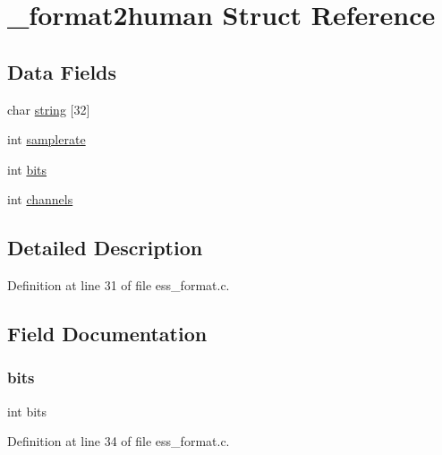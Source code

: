 \hypertarget{struct__format2human}{}\section{\+\_\+format2human Struct Reference}
\label{struct__format2human}
\subsection*{Data Fields}
\begin{DoxyCompactItemize}
\item 
char \hyperlink{struct__format2human_a14f2551e7b5032527b89aa2d4025523a}{string} \mbox{[}32\mbox{]}
\item 
int \hyperlink{struct__format2human_ac38751c7169cfeb9325a947cc0484286}{samplerate}
\item 
int \hyperlink{struct__format2human_ad1e28a1a66a25529b0b61b9ca4e66d44}{bits}
\item 
int \hyperlink{struct__format2human_a178795099d0608972755dfef8d8367e3}{channels}
\end{DoxyCompactItemize}


\subsection{Detailed Description}


Definition at line 31 of file ess\+\_\+format.\+c.



\subsection{Field Documentation}
\mbox{\label{struct__format2human_ad1e28a1a66a25529b0b61b9ca4e66d44}} 
\subsubsection{\texorpdfstring{bits}{bits}}
{\footnotesize\ttfamily int bits}



Definition at line 34 of file ess\+\_\+format.\+c.

\mbox{\label{struct__format2human_a178795099d0608972755dfef8d8367e3}} 
